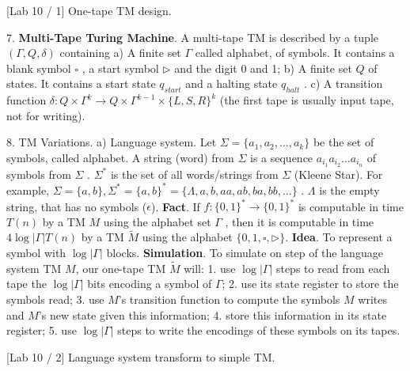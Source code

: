 \documentclass[10pt,a4paper]{article}
\begin{document}
[Lab 10 / 1] One-tape TM design.

7. \textbf{Multi-Tape Turing Machine}. A multi-tape TM is described by a tuple \((\Gamma ,Q,\delta)\) containing
a) A finite set \(\Gamma\) called alphabet, of symbols. It contains a blank symbol \(\square\) , a start symbol \(\triangleright\) and the digit 0 and 1;
b) A finite set \(Q\) of states. It contains a start state \(q_{start}\) and a halting state \(q_{halt}\) .
c) A transition function \(\delta :Q\times \Gamma^{k}\rightarrow Q\times \Gamma^{k - 1}\times \{L,S,R\}^{k}\) (the first tape is usually input tape, not for writing).

8. TM Variations.
a) Language system. Let \(\Sigma = \{a_1,a_2,\dots,a_k\}\) be the set of symbols, called alphabet. A string (word) from \(\Sigma\) is a sequence \(a_{i_1}a_{i_2}\dots a_{i_n}\) of symbols from \(\Sigma\) . \(\Sigma^{*}\) is the set of all words/strings from \(\Sigma\) (Kleene Star). For example, \(\Sigma = \{a,b\} ,\Sigma^{*} = \{a,b\}^{*} = \{\Lambda ,a,b,aa,ab,ba,bb,\dots \}\) . \(\Lambda\) is the empty string, that has no symbols (\(\epsilon\)).
\textbf{Fact}. If \(f:\{0,1\}^{*} \to \{0,1\}^{*}\) is computable in time \(T(n)\) by a TM \(M\) using the alphabet set \(\Gamma\) , then it is computable in time \(4\log|\Gamma|T(n)\) by a TM \(\tilde{M}\) using the alphabet \(\{0,1,\square,\triangleright\}\).
\textbf{Idea}. To represent a symbol with \(\log|\Gamma|\) blocks.
\textbf{Simulation}. To simulate on step of the language system TM \(M\), our one-tape TM \(\tilde{M}\) will:
    1. use \(\log|\Gamma|\) steps to read from each tape the \(\log|\Gamma|\) bits encoding a symbol of \(\Gamma\);
    2. use its state register to store the symbols read;
    3. use \(M\)'s transition function to compute the symbols \(M\) writes and \(M\)'s new state given this information;
    4. store this information in its state register;
    5. use \(\log|\Gamma|\) steps to write the encodings of these symbols on its tapes.

[Lab 10 / 2] Language system transform to simple TM.
\end{document}
